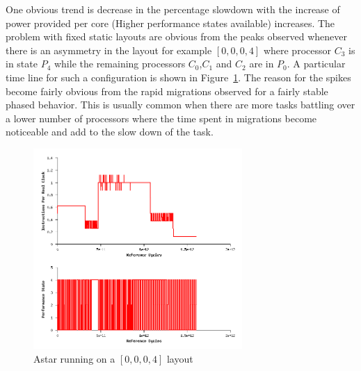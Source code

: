 One obvious trend is decrease in the percentage slowdown with the increase of power provided per 
core (Higher performance states available)
increases. The problem with fixed static layouts are obvious from the peaks observed
whenever there is an asymmetry in the layout for example $[0,0,0,4]$ where processor
$C_3$ is in state $P_4$ while the remaining processors $C_0$,$C_1$ and $C_2$ are in
$P_0$. A particular time line for such a configuration is shown in Figure~\ref{fig:fight_to_death}.
The reason for the spikes become fairly obvious from the rapid migrations observed for
a fairly stable phased behavior. This is usually common when there are more tasks battling
over a lower number of processors where the time spent in migrations
become noticeable and add to the slow down of the task. 



\begin{figure}[h!]
  \begin{center}
    \includegraphics[height=3in]{figures/astar_fight.png}%
    \caption{Astar running on a $[0,0,0,4]$ layout}
    \label{fig:fight_to_death}
  \end{center}
\end{figure}

